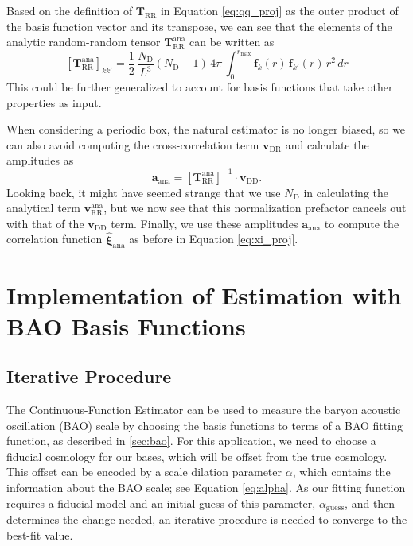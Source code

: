 \documentclass[modern]{aastex62}
\newcommand{\Est}{The Continuous-Function Estimator\xspace}
\newcommand{\inv}{^{-1}}
\newcommand{\bld}[1]{\bm{#1}} %
\newcommand{\vv}[1]{\bld{v}_\mathrm{#1}}
\newcommand{\TT}[1]{\bld{T}_\mathrm{#1}}
\newcommand{\ff}{\bld{f}}
\newcommand{\NN}[1]{N_\mathrm{#1}}
\begin{document}
Based on the definition of $\TT{RR}$ in Equation \ref{eq:qq_proj} as the outer product of the basis function vector and its transpose, we can see that the elements of the analytic random-random tensor $\TT{RR}^\mathrm{ana}$ can be written as
\begin{equation}
\left[ \TT{RR}^\mathrm{ana} \right]_{kk'} = \frac{1}{2} \, \frac{\NN{D}}{L^3} (\NN{D}-1) \, 4\pi \, \int_{0}^{r_\mathrm{max}} \ff_k(r) \, \ff_{k'}(r) \, r^2 \, dr
\end{equation}
This could be further generalized to account for basis functions that take other properties as input.

When considering a periodic box, the natural estimator is no longer biased, so we can also avoid computing the cross-correlation term $\vv{DR}$ and calculate the amplitudes as 
\begin{equation}
\bld{a}_{\mathrm{ana}} = \left[ \TT{RR}^\mathrm{ana} \right]\inv \cdot \vv{DD}.
\end{equation}
Looking back, it might have seemed strange that we use $\NN{D}$ in calculating the analytical term $\vv{RR}^\mathrm{ana}$, but we now see that this normalization prefactor cancels out with that of the $\vv{DD}$ term.
Finally, we use these amplitudes $\bld{a}_{\mathrm{ana}}$ to compute the correlation function $\bld{\hat{\xi}}_{\mathrm{ana}}$ as before in Equation \ref{eq:xi_proj}.

\section{Implementation of Estimation with BAO Basis Functions}\label{sec:baoiter}

\subsection{Iterative Procedure}
\Est can be used to measure the baryon acoustic oscillation (BAO) scale by choosing the basis functions to terms of a BAO fitting function, as described in \ref{sec:bao}.
For this application, we need to choose a fiducial cosmology for our bases, which will be offset from the true cosmology.
This offset can be encoded by a scale dilation parameter $\alpha$, which contains the information about the BAO scale; see Equation \ref{eq:alpha}. 
As our fitting function requires a fiducial model and an initial guess of this parameter, $\alpha_\mathrm{guess}$, and then determines the change needed, an iterative procedure is needed to converge to the best-fit value.
\end{document}

